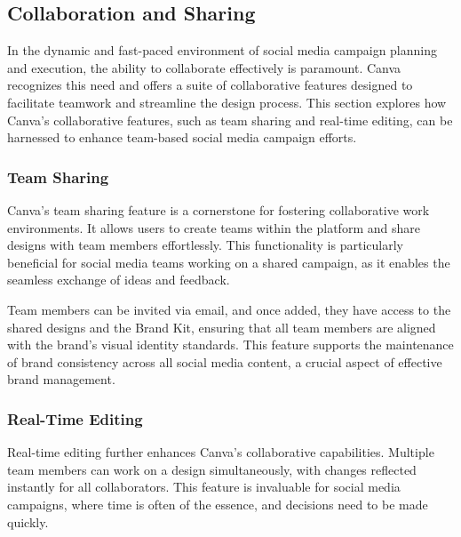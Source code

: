 \documentclass[
]{book}
\begin{document}
\hypertarget{collaboration-and-sharing}{%
\subsection*{Collaboration and Sharing}\label{collaboration-and-sharing}}

In the dynamic and fast-paced environment of social media campaign planning and execution, the ability to collaborate effectively is paramount. Canva recognizes this need and offers a suite of collaborative features designed to facilitate teamwork and streamline the design process. This section explores how Canva's collaborative features, such as team sharing and real-time editing, can be harnessed to enhance team-based social media campaign efforts.

\hypertarget{team-sharing}{%
\subsubsection*{Team Sharing}\label{team-sharing}}

Canva's team sharing feature is a cornerstone for fostering collaborative work environments. It allows users to create teams within the platform and share designs with team members effortlessly. This functionality is particularly beneficial for social media teams working on a shared campaign, as it enables the seamless exchange of ideas and feedback.

Team members can be invited via email, and once added, they have access to the shared designs and the Brand Kit, ensuring that all team members are aligned with the brand's visual identity standards. This feature supports the maintenance of brand consistency across all social media content, a crucial aspect of effective brand management.

\hypertarget{real-time-editing}{%
\subsubsection*{Real-Time Editing}\label{real-time-editing}}

Real-time editing further enhances Canva's collaborative capabilities. Multiple team members can work on a design simultaneously, with changes reflected instantly for all collaborators. This feature is invaluable for social media campaigns, where time is often of the essence, and decisions need to be made quickly.
\end{document}

